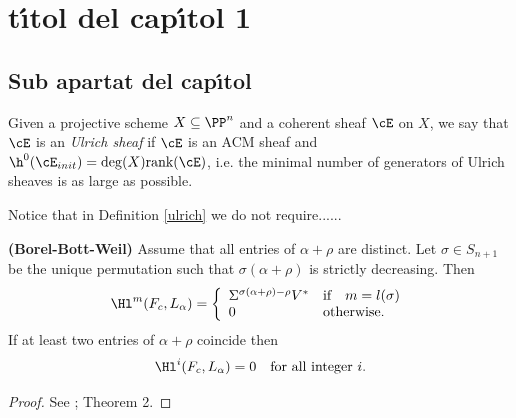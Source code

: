 \chapter[titol abreujat 1]{t\'{\i}tol del cap\'{\i}tol 1}
\section{Sub apartat del cap\'{\i}tol}

\begin{definition}  \label{ulrich}  \rm Given a projective scheme $X\subseteq \PP^n$ and a coherent sheaf $\cE$ on $X$, we say that
$\cE$ is an \emph{Ulrich sheaf} if  $\cE$ is an ACM sheaf and $\h^0(\cE_{init})=\deg(X)\mbox{rank}(\cE)$, i.e. the minimal
number of generators of Ulrich sheaves is as large as possible.
\end{definition}


Notice that in Definition \ref{ulrich} we do not require......

\vspace{3mm}


\begin{theorem}{\bf (Borel-Bott-Weil)}
\label{bottLine}
Assume that all entries of $\alpha+\rho$ are distinct.  Let $\sigma \in S_{n+1}$ be the unique permutation such
    that $\sigma(\alpha+\rho)$ is strictly decreasing. Then
\[ \Hl^m(F_c, L_{\alpha})= \left \{ \begin{array}{ll}
\Sigma^{\sigma(\alpha+\rho)-\rho} V^* & \mbox{if} \quad m=l(\sigma) \\
0 &\mbox{otherwise.}
 \end{array} \right. \]
If at least two entries of $\alpha + \rho $ coincide then $$
\Hl^{i}(F_c, L_{\alpha})= 0 \quad \mbox{for all integer } i.$$
\end{theorem}
\begin{proof}  See \cite{cartmell1986}; Theorem 2.
\end{proof}




